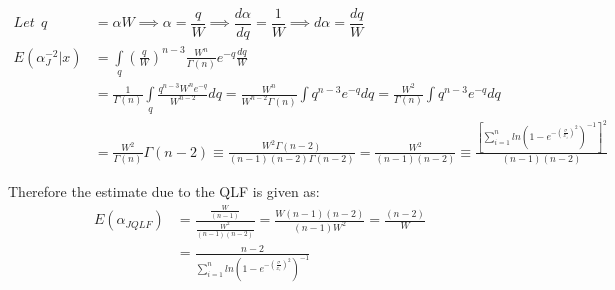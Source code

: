 \documentclass[a4paper,12pt]{report}
\begin{document}
\begin{equation}\label{3.31b}
\begin{split}
Let\ \ q&=\alpha W\implies\alpha=\dfrac{q}{W}\implies\dfrac{d\alpha}{dq}=\dfrac{1}{W}\implies d\alpha=\dfrac{dq}{W}\\
E(\alpha_J^{-2}|x)&=\int\limits_{q}\left(\frac{q}{W}\right)^{n-3}\frac{W^n}{\Gamma(n)}e^{-q}\frac{dq}{W}\\
&=\frac{1}{\Gamma(n)}\int\limits_{q}\frac{q^{n-3}W^ne^{-q}}{W^{n-2}}dq=\frac{W^n}{W^{n-2}\Gamma(n)}\int q^{n-3}e^{-q}dq=\frac{W^2}{\Gamma(n)}\int q^{n-3}e^{-q}dq\\
&=\frac{W^2}{\Gamma(n)}\Gamma(n-2)\equiv \frac{W^2 \Gamma(n-2)}{(n-1)(n-2)\Gamma(n-2)}=\frac{W^2 }{(n-1)(n-2)}\equiv\frac{\left[\sum\limits_{ i=1 }^{n}ln\left(1-e^{-\left(\frac{\sigma}{x_i}\right)^2}\right)^{-1}\right]^2}{(n-1)(n-2)}
\end{split}
\end{equation}

Therefore the estimate due to the QLF is given as:
\begin{equation}
\begin{split}
E(\alpha_{JQLF})&=\frac{\frac{W }{(n-1)}}{\frac{W^2 }{(n-1)(n-2)}}=\frac{W(n-1)(n-2)}{(n-1)W^2}=\frac{(n-2)}{W}\\
&=\frac{n-2}{\sum\limits_{ i=1 }^{n}ln\left(1-e^{-\left(\frac{\sigma}{x_i}\right)^2}\right)^{-1}}
\end{split}
\end{equation}
\end{document}
